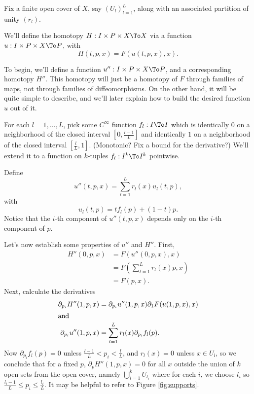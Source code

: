 
Fix a finite open cover of $X$, say $(U_l)_{l=1}^L$, along with an
associated partition of unity $(r_l)$.

We'll define the homotopy $H:I \times P \times X \To X$ via a function
$u:I \times P \times X \To P$, with
\begin{equation*}
H(t,p,x) = F(u(t,p,x),x).
\end{equation*}

To begin, we'll define a function $u'' : I \times P \times X \To P$, and
a corresponding homotopy $H''$. This homotopy will just be a homotopy of
$F$ through families of maps, not through families of diffeomorphisms. On
the other hand, it will be quite simple to describe, and we'll later
explain how to build the desired function $u$ out of it.

For each $l = 1, \ldots, L$, pick some $C^\infty$ function $f_l : I \To
I$ which is identically $0$ on a neighborhood of the closed interval $[0,\frac{l-1}{L}]$
and identically $1$ on a neighborhood of the closed interval $[\frac{l}{L},1]$. (Monotonic?
Fix a bound for the derivative?) We'll extend it to a function on
$k$-tuples $f_l : I^k \To I^k$ pointwise.

Define $$u''(t,p,x) = \sum_{l=1}^L r_l(x) u_l(t,p),$$ with
$$u_l(t,p) = t f_l(p) + (1-t)p.$$ Notice that the $i$-th component of $u''(t,p,x)$ depends only on the $i$-th component of $p$.

Let's now establish some properties of $u''$ and $H''$. First,
\begin{align*}
H''(0,p,x) & = F(u''(0,p,x),x) \\
           & = F(\sum_{l=1}^L r_l(x) p, x) \\
           & = F(p,x).
\end{align*}
Next, calculate the derivatives
\begin{align*}
\partial_{p_i} H''(1,p,x) & = \partial_{p_i}u''(1,p,x) \partial_1 F(u(1,p,x),x) \\
\intertext{and}
\partial_{p_i}u''(1,p,x) & = \sum_{l=1}^L r_l(x) \partial_{p_i} f_l(p).
\end{align*}
Now $\partial_{p_i} f_l(p) = 0$ unless $\frac{l-1}{L} < p_i < \frac{l}{L}$, and $r_l(x) = 0$ unless $x \in U_l$,
so we conclude that for a fixed $p$, $\partial_p H''(1,p,x) = 0$ for all $x$ outside the union of $k$ open sets from the open cover, namely
$\bigcup_{i=1}^k U_{l_i}$ where for each $i$, we choose $l_i$ so $\frac{l_i -1}{L} \leq p_i \leq \frac{l_i}{L}$. It may be helpful to refer to Figure \ref{fig:supports}.

